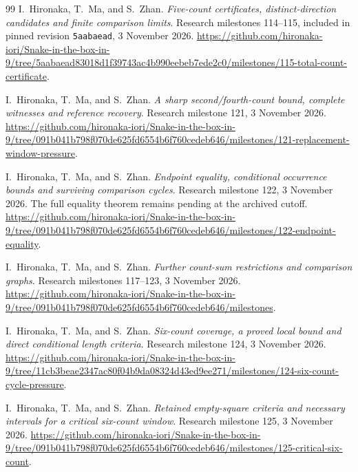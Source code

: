 \documentclass[11pt,a4paper]{article}
\theoremstyle{definition}
\theoremstyle{remark}
\begin{document}
\begin{thebibliography}{99}
I.~Hironaka, T.~Ma, and S.~Zhan. \emph{Five-count certificates, distinct-direction candidates and finite comparison limits}. Research milestones 114--115, included in pinned revision \texttt{5aabaead}, 3 November 2026.
\url{https://github.com/hironaka-iori/Snake-in-the-box-in-9/tree/5aabaead83018d1f39743ac4b990eebeb7ede2c0/milestones/115-total-count-certificate}.

I.~Hironaka, T.~Ma, and S.~Zhan. \emph{A sharp second/fourth-count bound, complete witnesses and reference recovery}. Research milestone 121, 3 November 2026.
\url{https://github.com/hironaka-iori/Snake-in-the-box-in-9/tree/091b041b798f070de625fd6554b6f760cedeb646/milestones/121-replacement-window-pressure}.

I.~Hironaka, T.~Ma, and S.~Zhan. \emph{Endpoint equality, conditional occurrence bounds and surviving comparison cycles}. Research milestone 122, 3 November 2026. The full equality theorem remains pending at the archived cutoff.
\url{https://github.com/hironaka-iori/Snake-in-the-box-in-9/tree/091b041b798f070de625fd6554b6f760cedeb646/milestones/122-endpoint-equality}.

I.~Hironaka, T.~Ma, and S.~Zhan. \emph{Further count-sum restrictions and comparison graphs}. Research milestones 117--123, 3 November 2026.
\url{https://github.com/hironaka-iori/Snake-in-the-box-in-9/tree/091b041b798f070de625fd6554b6f760cedeb646/milestones}.

I.~Hironaka, T.~Ma, and S.~Zhan. \emph{Six-count coverage, a proved local bound and direct conditional length criteria}. Research milestone 124, 3 November 2026.
\url{https://github.com/hironaka-iori/Snake-in-the-box-in-9/tree/11cb3beae2347ac80f04b9da08324d43ed9ee271/milestones/124-six-count-cycle-pressure}.

I.~Hironaka, T.~Ma, and S.~Zhan. \emph{Retained empty-square criteria and necessary intervals for a critical six-count window}. Research milestone 125, 3 November 2026.
\url{https://github.com/hironaka-iori/Snake-in-the-box-in-9/tree/091b041b798f070de625fd6554b6f760cedeb646/milestones/125-critical-six-count}.



\end{thebibliography}
\end{document}

